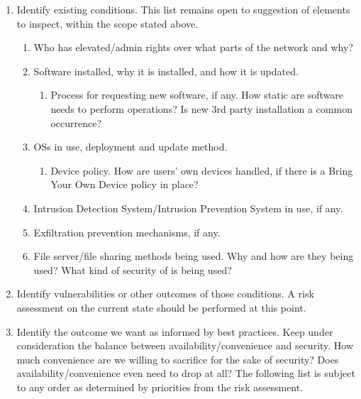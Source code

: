 \begin{enumerate}
\def\labelenumi{\arabic{enumi}.}
\item
  Identify existing conditions. This list remains open to suggestion of
  elements to inspect, within the scope stated above.

  \begin{enumerate}
  \def\labelenumii{\arabic{enumii}.}
  \item
    Who has elevated/admin rights over what parts of the network and
    why?
  \item
    Software installed, why it is installed, and how it is updated.

    \begin{enumerate}
    \def\labelenumiii{\arabic{enumiii}.}
    \tightlist
    \item
      Process for requesting new software, if any. How static are
      software needs to perform operations? Is new 3rd party
      installation a common occurrence?
    \end{enumerate}
  \item
    OSs in use, deployment and update method.

    \begin{enumerate}
    \def\labelenumiii{\arabic{enumiii}.}
    \tightlist
    \item
      Device policy. How are users' own devices handled, if there is a
      Bring Your Own Device policy in place?
    \end{enumerate}
  \item
    Intrusion Detection System/Intrusion Prevention System in use, if
    any.
  \item
    Exfiltration prevention mechanisms, if any.
  \item
    File server/file sharing methods being used. Why and how are they
    being used? What kind of security of is being used?
  \end{enumerate}
\item
  Identify vulnerabilities or other outcomes of those conditions. A risk
  assessment on the current state should be performed at this point.
\item
  Identify the outcome we want as informed by best practices. Keep under
  consideration the balance between availability/convenience and
  security. How much convenience are we willing to sacrifice for the
  sake of security? Does availability/convenience even need to drop at
  all? The following list is subject to any order as determined by
  priorities from the risk assessment.


\end{enumerate}
